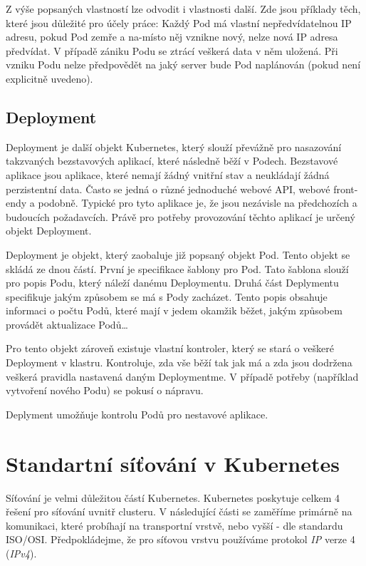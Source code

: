 Z výše popsaných vlastností lze odvodit i vlastnosti další. Zde jsou příklady těch, které jsou důležité pro účely práce: Každý Pod má vlastní nepředvídatelnou IP adresu, pokud Pod zemře a na-místo něj vznikne nový, nelze nová IP adresa předvídat. V případě zániku Podu se ztrácí veškerá data v něm uložená. Při vzniku Podu nelze předpovědět na jaký server bude Pod naplánován (pokud není explicitně uvedeno). 

\subsection{Deployment}
Deployment je další objekt Kubernetes, který slouží převážně pro nasazování takzvaných bezstavových aplikací, které následně běží v Podech. Bezstavové aplikace jsou aplikace, které nemají žádný vnitřní stav a neukládají žádná perzistentní data. Často se jedná o různé jednoduché webové API, webové front-endy a podobně. Typické pro tyto aplikace je, že jsou nezávisle na předchozích a budoucích požadavcích. Právě pro potřeby provozování těchto aplikací je určený objekt Deployment.

Deployment je objekt, který zaobaluje již popsaný objekt Pod. Tento objekt se skládá ze dnou částí. První je specifikace šablony pro Pod. Tato šablona slouží pro popis Podu, který náleží danému Deploymentu. Druhá část Deplymentu specifikuje jakým způsobem se má s Pody zacházet. Tento popis obsahuje informaci o počtu Podů, které mají v jedem okamžik běžet, jakým způsobem provádět aktualizace Podů\ldots

Pro tento objekt zároveň existuje vlastní kontroler, který se stará o veškeré Deployment v klastru. Kontroluje, zda vše běží tak jak má a zda jsou dodržena veškerá pravidla nastavená daným Deploymentme. V případě potřeby (například vytvoření nového Podu) se pokusí o nápravu.

Deplyment umožňuje kontrolu Podů pro nestavové aplikace.
\section{Standartní síťování v Kubernetes}
Síťování je velmi důležitou částí Kubernetes. Kubernetes poskytuje celkem 4 řešení pro síťování uvnitř clusteru. V následující části se zaměříme primárně na komunikaci, které probíhají na transportní vrstvě, nebo vyšší - dle standardu ISO/OSI. Předpokládejme, že pro síťovou vrstvu používáme protokol \textit{IP} verze 4 (\textit{IPv4}).

